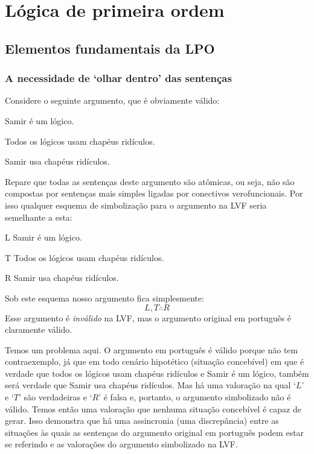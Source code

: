 \normalsize
\part{Lógica de primeira ordem}
\label{ch.FOL}
\chapter{Elementos fundamentais da LPO}\label{s:FOLBuildingBlocks}

\section[Olhar dentro das sentenças]{A necessidade de `olhar dentro' das sentenças}
Considere o seguinte argumento, que é obviamente válido:
\begin{earg}\label{willard1}
	\item[] Samir é um lógico.
	\item[] Todos os lógicos usam chapéus ridículos.
	\item[\therefore] Samir usa chapéus ridículos.
\end{earg}
Repare que todas as sentenças deste argumento são atômicas, ou seja, não são compostas por sentenças mais simples ligadas por conectivos verofuncionais.
Por isso qualquer esquema de simbolização para o argumento na LVF seria semelhante a esta:
\begin{ekey}
\item[L] Samir é um lógico.
\item[T] Todos os lógicos usam chapéus ridículos.
\item[R] Samir usa chapéus ridículos.
\end{ekey}
Sob este esquema nosso argumento fica simplesmente:
$$L, T \therefore R$$
Esse argumento é \emph{inválido} na LVF, mas o argumento original em português é claramente válido.

Temos um problema aqui.
O argumento em português é válido porque não tem contraexemplo, já que em todo cenário hipotético (situação concebível) em que é verdade que todos os lógicos usam chapéus ridículos e Samir é um lógico, também será verdade que Samir usa chapéus ridículos.
Mas há uma valoração na qual `$L$' e `$T$' são verdadeiras e `$R$' é falsa e, portanto, o argumento simbolizado não é válido.
Temos então uma valoração que nenhuma situação concebível é capaz de gerar.
Isso demonstra que há uma assincronia (uma discrepância) entre as situações às quais as sentenças do  argumento original em português podem estar se referindo e as valorações do argumento simbolizado na LVF.

